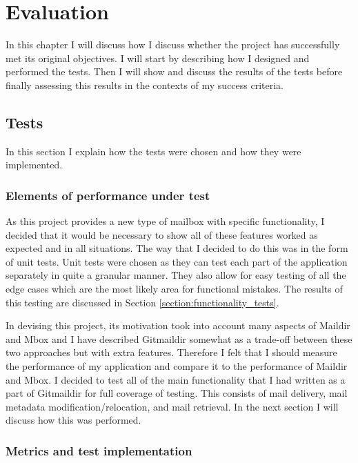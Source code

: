 \chapter{Evaluation} \label{section:evaluation}

In this chapter I will discuss how I discuss whether the project has successfully met its original objectives. I will start by describing how I designed and performed the tests. Then I will show and discuss the results of the tests before finally assessing this results in the contexts of my success criteria.

\section{Tests}

In this section I explain how the tests were chosen and how they were implemented.

\subsection{Elements of performance under test}

As this project provides a new type of mailbox with specific functionality, I decided that it would be necessary to show all of these features worked as expected and in all situations. The way that I decided to do this was in the form of unit tests. Unit tests were chosen as they can test each part of the application separately in quite a granular manner. They also allow for easy testing of all the edge cases which are the most likely area for functional mistakes. The results of this testing are discussed in Section \ref{section:functionality_tests}.

In devising this project, its motivation took into account many aspects of Maildir and Mbox and I have described Gitmaildir somewhat as a trade-off between these two approaches but with extra features. Therefore I felt that I should measure the performance of my application and compare it to the performance of Maildir and Mbox. I decided to test all of the main functionality that I had written as a part of Gitmaildir for full coverage of testing. This consists of mail delivery, mail metadata modification/relocation, and mail retrieval. In the next section I will discuss how this was performed.

\subsection{Metrics and test implementation}

